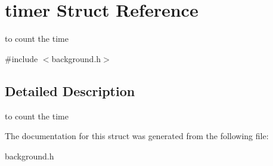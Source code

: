 \hypertarget{structtimer}{}\section{timer Struct Reference}
\label{structtimer}


to count the time  




{\ttfamily \#include $<$background.\+h$>$}



\subsection{Detailed Description}
to count the time 

The documentation for this struct was generated from the following file\+:\begin{DoxyCompactItemize}
\item 
background.\+h\end{DoxyCompactItemize}
